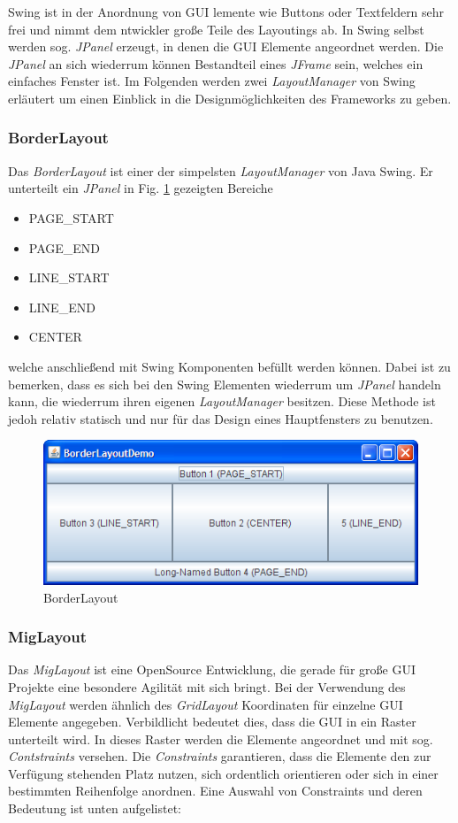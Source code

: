 \documentclass[a4paper, 11pt]{article} %
\begin{document}
Swing ist in der Anordnung von GUI lemente wie Buttons oder Textfeldern sehr frei und nimmt dem ntwickler große Teile des Layoutings ab. In Swing selbst werden sog. \emph{JPanel} erzeugt, in denen die GUI Elemente angeordnet werden. Die \emph{JPanel} an sich wiederrum können Bestandteil eines \emph{JFrame} sein, welches ein einfaches Fenster ist. Im Folgenden werden zwei \emph{LayoutManager} von Swing erläutert um einen Einblick in die Designmöglichkeiten des Frameworks zu geben.

\subsubsection{BorderLayout}
Das \emph{BorderLayout} ist einer der simpelsten \emph{LayoutManager} von Java Swing. Er unterteilt ein \emph{JPanel} in Fig. \ref{fig:borderlayout} gezeigten Bereiche
\begin{itemize}
    \item {PAGE\_START}
    \item {PAGE\_END}
    \item {LINE\_START}
    \item {LINE\_END}
    \item {CENTER}
\end{itemize}
welche anschließend mit Swing Komponenten befüllt werden können. Dabei ist zu bemerken, dass es sich bei den Swing Elementen wiederrum um \emph{JPanel} handeln kann, die wiederrum ihren eigenen \emph{LayoutManager} besitzen. Diese Methode ist jedoh relativ statisch und nur für das Design eines Hauptfensters zu benutzen.

\begin{figure}[!htp]
\includegraphics[width=\textwidth]{img/BorderLayoutDemo}
\caption{BorderLayout}
\label{fig:borderlayout}
\end{figure}

\subsubsection{MigLayout}
Das \emph{MigLayout} ist eine OpenSource Entwicklung, die gerade für große GUI Projekte eine besondere Agilität mit sich bringt. Bei der Verwendung des \emph{MigLayout} werden ähnlich des \emph{GridLayout} Koordinaten für einzelne GUI Elemente angegeben. Verbildlicht bedeutet dies, dass die GUI in ein Raster unterteilt wird. In dieses Raster werden die Elemente angeordnet und mit sog. \emph{Contstraints} versehen. Die \emph{Constraints} garantieren, dass die Elemente den zur Verfügung stehenden Platz nutzen, sich ordentlich orientieren oder sich in einer bestimmten Reihenfolge anordnen. Eine Auswahl von Constraints und deren Bedeutung ist unten aufgelistet:
\end{document}
